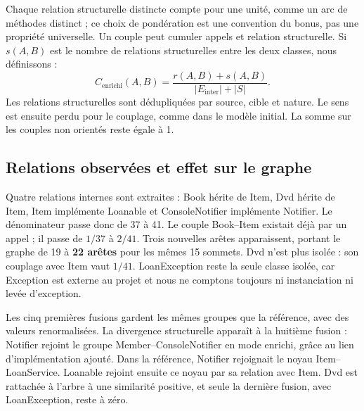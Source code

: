\documentclass[11pt,a4paper]{article}
\begin{document}
Chaque relation structurelle distincte compte pour une unité, comme un arc
de méthodes distinct ; ce choix de pondération est une convention du bonus,
pas une propriété universelle. Un couple peut cumuler appels et relation
structurelle. Si $s(A,B)$ est le nombre de relations structurelles entre les
deux classes, nous définissons :
\[
C_{\mathrm{enrichi}}(A,B)=\frac{r(A,B)+s(A,B)}{|E_{\mathrm{inter}}|+|S|}.
\]
Les relations structurelles sont dédupliquées par source, cible et nature.
Le sens est ensuite perdu pour le couplage, comme dans le modèle initial.
La somme sur les couples non orientés reste égale à 1.

\subsection{Relations observées et effet sur le graphe}
Quatre relations internes sont extraites : Book hérite de Item, Dvd hérite de
Item, Item implémente Loanable et ConsoleNotifier implémente Notifier.
Le dénominateur passe donc de 37 à 41. Le couple Book--Item existait déjà
par un appel ; il passe de $1/37$ à $2/41$. Trois nouvelles arêtes apparaissent,
portant le graphe de 19 à \textbf{22 arêtes} pour les mêmes 15 sommets.
Dvd n'est plus isolée : son couplage avec Item vaut $1/41$.
LoanException reste la seule classe isolée, car Exception est externe au
projet et nous ne comptons toujours ni instanciation ni levée d'exception.

Les cinq premières fusions gardent les mêmes groupes que la référence,
avec des valeurs renormalisées. La divergence structurelle apparaît à la
huitième fusion : Notifier rejoint le groupe Member--ConsoleNotifier en mode
enrichi, grâce au lien d'implémentation ajouté. Dans la référence, Notifier
rejoignait le noyau Item--LoanService. Loanable rejoint ensuite ce noyau par
sa relation avec Item. Dvd est rattachée à l'arbre à une similarité positive,
et seule la dernière fusion, avec LoanException, reste à zéro.
\end{document}
